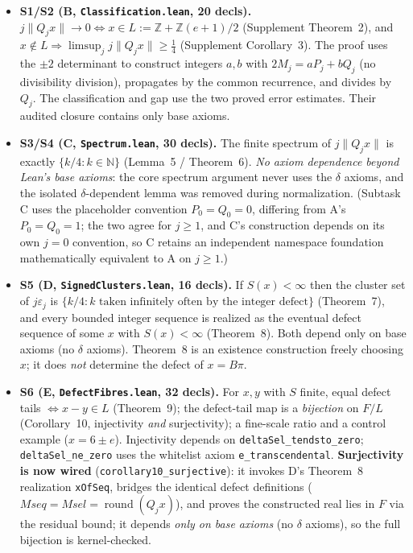 \documentclass[11pt]{amsart}
\theoremstyle{definition}
\theoremstyle{remark}
\numberwithin{equation}{section}
\newcommand{\Z}{\mathbb{Z}}
\newcommand{\N}{\mathbb{N}}
\newcommand{\ee}{e}
\begin{document}
\begin{itemize}
\item \textbf{S1/S2 (B, \texttt{Classification.lean}, 20 decls).} $j\|Q_j x\|\to0\iff x\in L:=\Z+\Z(\ee+1)/2$ (Supplement Theorem~2), and $x\notin L\Rightarrow\limsup_j j\|Q_j x\|\ge\tfrac14$ (Supplement Corollary~3). The proof uses the $\pm2$ determinant to construct integers $a,b$ with $2M_j=aP_j+bQ_j$ (no divisibility division), propagates by the common recurrence, and divides by $Q_j$. The classification and gap use the two proved error estimates. Their audited closure contains only base axioms.
\item \textbf{S3/S4 (C, \texttt{Spectrum.lean}, 30 decls).} The finite spectrum of $j\|Q_j x\|$ is exactly $\{k/4:k\in\N\}$ (Lemma~5 / Theorem~6). \emph{No axiom dependence beyond Lean's base axioms}: the core spectrum argument never uses the $\delta$ axioms, and the isolated $\delta$-dependent lemma was removed during normalization. (Subtask C uses the placeholder convention $P_0=Q_0=0$, differing from A's $P_0=Q_0=1$; the two agree for $j\ge1$, and C's construction depends on its own $j=0$ convention, so C retains an independent namespace foundation mathematically equivalent to A on $j\ge1$.)
\item \textbf{S5 (D, \texttt{SignedClusters.lean}, 16 decls).} If $S(x)<\infty$ then the cluster set of $j\varepsilon_j$ is $\{k/4:k\text{ taken infinitely often by the integer defect}\}$ (Theorem~7), and every bounded integer sequence is realized as the eventual defect sequence of some $x$ with $S(x)<\infty$ (Theorem~8). Both depend only on base axioms (no $\delta$ axioms). Theorem~8 is an existence construction freely choosing $x$; it does \emph{not} determine the defect of $x=B\pi$.
\item \textbf{S6 (E, \texttt{DefectFibres.lean}, 32 decls).} For $x,y$ with $S$ finite, equal defect tails $\iff x-y\in L$ (Theorem~9); the defect-tail map is a \emph{bijection} on $F/L$ (Corollary~10, injectivity \emph{and} surjectivity); a fine-scale ratio and a control example ($x=6\pm\ee$). Injectivity depends on \texttt{deltaSel\_\allowbreak{}tendsto\_\allowbreak{}zero}; \texttt{deltaSel\_\allowbreak{}ne\_\allowbreak{}zero} uses the whitelist axiom \texttt{e\_\allowbreak{}transcendental}. \textbf{Surjectivity is now wired} (\texttt{corollary10\_\allowbreak{}surjective}): it invokes D's Theorem~8 realization \texttt{xOfSeq}, bridges the identical defect definitions ($Mseq=Msel=\operatorname{round}(Q_j x)$), and proves the constructed real lies in $F$ via the residual bound; it depends \emph{only on base axioms} (no $\delta$ axioms), so the full bijection is kernel-checked.

\end{itemize}
\end{document}
